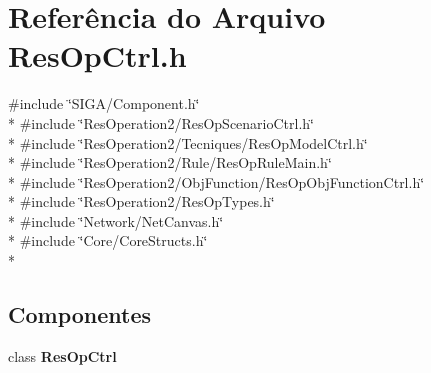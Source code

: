\section{Referência do Arquivo Res\+Op\+Ctrl.\+h}
\label{_res_op_ctrl_8h}
{\ttfamily \#include \char`\"{}S\+I\+G\+A/\+Component.\+h\char`\"{}}\\*
{\ttfamily \#include \char`\"{}Res\+Operation2/\+Res\+Op\+Scenario\+Ctrl.\+h\char`\"{}}\\*
{\ttfamily \#include \char`\"{}Res\+Operation2/\+Tecniques/\+Res\+Op\+Model\+Ctrl.\+h\char`\"{}}\\*
{\ttfamily \#include \char`\"{}Res\+Operation2/\+Rule/\+Res\+Op\+Rule\+Main.\+h\char`\"{}}\\*
{\ttfamily \#include \char`\"{}Res\+Operation2/\+Obj\+Function/\+Res\+Op\+Obj\+Function\+Ctrl.\+h\char`\"{}}\\*
{\ttfamily \#include \char`\"{}Res\+Operation2/\+Res\+Op\+Types.\+h\char`\"{}}\\*
{\ttfamily \#include \char`\"{}Network/\+Net\+Canvas.\+h\char`\"{}}\\*
{\ttfamily \#include \char`\"{}Core/\+Core\+Structs.\+h\char`\"{}}\\*
\subsection*{Componentes}
\begin{DoxyCompactItemize}
\item 
class {\bf Res\+Op\+Ctrl}
\end{DoxyCompactItemize}
